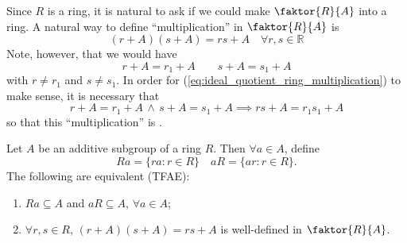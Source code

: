 Since $R$ is a ring, it is natural to ask if we could make $\faktor{R}{A}$ into a ring. A natural way to define ``multiplication'' in $\faktor{R}{A}$ is
\begin{equation}\tag{$\dagger$}\label{eq:ideal_quotient_ring_multiplication}
  (r + A)(s + A) = rs + A \quad \forall r, s \in \mathbb{R}
\end{equation}
Note, however, that we would have
\begin{equation*}
  r + A = r_1 + A \qquad s + A = s_1 + A
\end{equation*}
with $r \neq r_1$ and $s \neq s_1$. In order for (\ref{eq:ideal_quotient_ring_multiplication}) to make sense, it is necessary that
\begin{equation*}
  r + A = r_1 + A \, \land \, s + A = s_1 + A \implies rs + A = r_1 s_1 + A
\end{equation*}
so that this ``multiplication'' is .

\begin{propo}
\label{propo:equivalent_defn_of_a_well_defined_coset_multiplication}
  Let $A$ be an additive subgroup of a ring $R$. Then $\forall a \in A$, define
  \begin{equation*}
    Ra = \{ ra : r \in R \} \quad aR = \{ ar : r \in R \}.
  \end{equation*}
  The following are equivalent (TFAE):
  \begin{enumerate}
    \item $Ra \subseteq A$ and $aR \subseteq A$, $\forall a \in A$;
    \item $\forall r, s \in R$, $(r + A)(s + A) = rs + A$ is well-defined in $\faktor{R}{A}$.
  \end{enumerate}
\end{propo}

